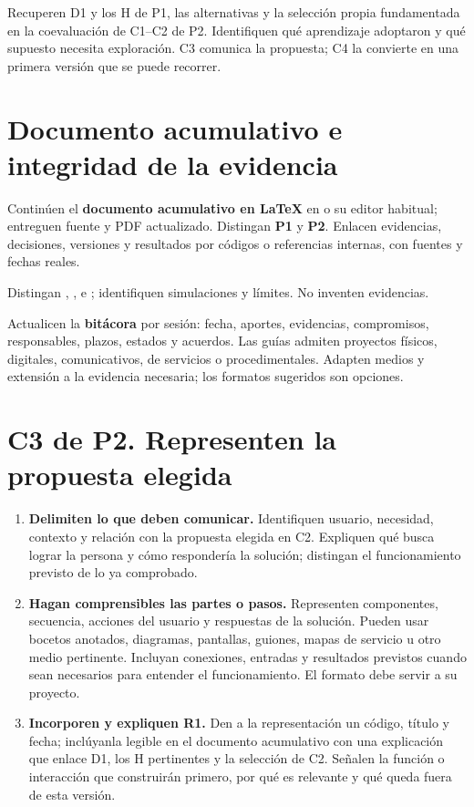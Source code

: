 Recuperen D1 y los H de P1, las alternativas y la selección propia fundamentada en la coevaluación de C1--C2 de P2. Identifiquen qué aprendizaje adoptaron y qué supuesto necesita exploración. C3 comunica la propuesta; C4 la convierte en una primera versión que se puede recorrer.

\section*{Documento acumulativo e integridad de la evidencia}
Continúen el \textbf{documento acumulativo en LaTeX} en  o su editor habitual; entreguen fuente y PDF actualizado. Distingan \textbf{P1} y \textbf{P2}. Enlacen evidencias, decisiones, versiones y resultados por códigos o referencias internas, con fuentes y fechas reales.

Distingan , ,  e ; identifiquen simulaciones y límites.  No inventen evidencias.

Actualicen la \textbf{bitácora} por sesión: fecha, aportes, evidencias, compromisos, responsables, plazos, estados y acuerdos. Las guías admiten proyectos físicos, digitales, comunicativos, de servicios o procedimentales. Adapten medios y extensión a la evidencia necesaria; los formatos sugeridos son opciones.

\section*{C3 de P2. Representen la propuesta elegida}
\begin{enumerate}[series=pasos]
\item \textbf{Delimiten lo que deben comunicar.} Identifiquen usuario, necesidad, contexto y relación con la propuesta elegida en C2. Expliquen qué busca lograr la persona y cómo respondería la solución; distingan el funcionamiento previsto de lo ya comprobado.
\item \textbf{Hagan comprensibles las partes o pasos.} Representen componentes, secuencia, acciones del usuario y respuestas de la solución. Pueden usar bocetos anotados, diagramas, pantallas, guiones, mapas de servicio u otro medio pertinente. Incluyan conexiones, entradas y resultados previstos cuando sean necesarios para entender el funcionamiento. El formato debe servir a su proyecto.
\item \textbf{Incorporen y expliquen R1.} Den a la representación un código, título y fecha; inclúyanla legible en el documento acumulativo con una explicación que enlace D1, los H pertinentes y la selección de C2. Señalen la función o interacción que construirán primero, por qué es relevante y qué queda fuera de esta versión.
\end{enumerate}

